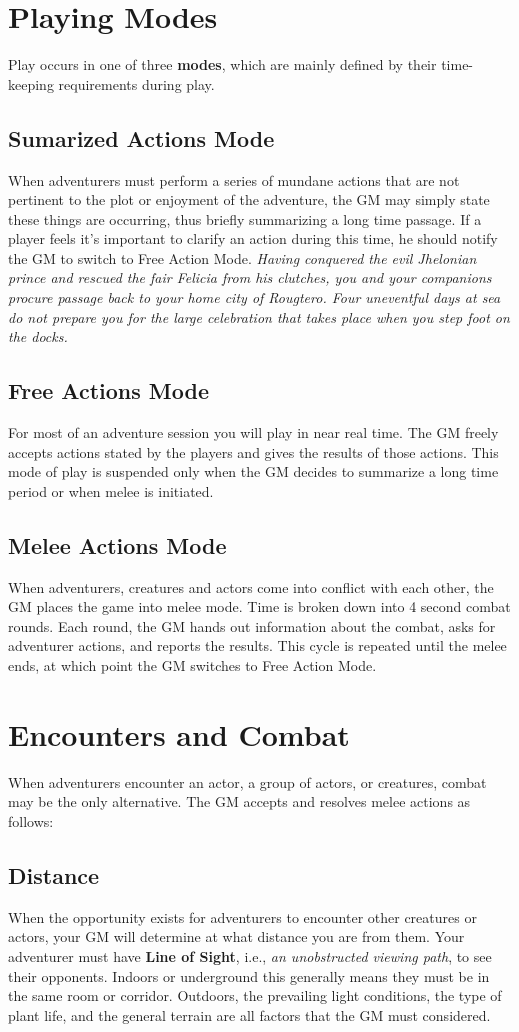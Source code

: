 \begin{multicols*}{2}
\section{Playing Modes}
Play occurs in one of three \textbf{modes}, which are mainly defined by their time-keeping requirements during play.
\subsection{Sumarized Actions Mode}
When adventurers must perform a series of mundane actions that are not pertinent to the plot or  enjoyment of the adventure, the GM may simply state these things are occurring, thus briefly summarizing a long time passage. If a player feels it's important to clarify an action during this time, he should notify the GM to switch to Free Action Mode.
\textit{Having conquered the evil Jhelonian prince and rescued the fair Felicia from his clutches, you and your 
companions procure passage back to your home city of Rougtero. Four uneventful days at sea do not prepare you for the large celebration that takes place when you step foot on the docks.}
\subsection{Free Actions Mode}
For most of an adventure session you will play in near real time. The GM freely accepts actions stated by the players and gives the results of those actions. This mode of play is suspended only when the GM decides to summarize a long time period or when melee is initiated.
\subsection{Melee Actions Mode}
When adventurers, creatures and actors come into conflict with each other, the GM places the game into melee mode. Time is broken down into 4 second combat rounds. Each round, the GM hands out information about the combat, asks for adventurer actions, and reports the results. This cycle is repeated until the melee ends, at which point the GM switches to Free Action Mode.
\section{Encounters and Combat}
When adventurers encounter an actor, a group of actors, or creatures, combat may be the only alternative. The GM accepts and resolves melee actions as follows:
\subsection{Distance}
When the opportunity exists for adventurers to encounter other creatures or actors, your GM will determine at what distance you are from them. Your adventurer must have \textbf{Line of Sight}, i.e., \textit{an unobstructed viewing path}, to see their opponents. Indoors or underground this generally means they must be in the same room or corridor. Outdoors, the prevailing light conditions, the type of plant life, and the general terrain are all factors that the GM must considered.

\end{multicols*}
